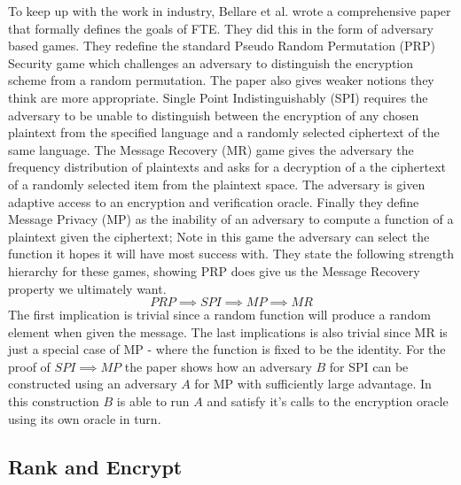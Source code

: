 \documentclass[10pt,a4paper]{article}
\begin{document}
To keep up with the work in industry, Bellare et al. wrote a comprehensive paper\cite{fpe} that formally defines the goals of FTE. They did this in the form of adversary based games. They redefine the standard Pseudo Random Permutation (PRP) Security game which challenges an adversary to distinguish the encryption scheme from a random permutation. The paper also gives weaker notions they think are more appropriate. Single Point Indistinguishably (SPI) requires the adversary to be unable to distinguish between the encryption of any chosen plaintext from the specified language and a randomly selected ciphertext of the same language. The Message Recovery (MR) game gives the adversary the frequency distribution of plaintexts and asks for a decryption of a the ciphertext of a randomly selected item from the plaintext space. The adversary is given adaptive access to an encryption and verification oracle. Finally they define Message Privacy (MP) as the inability of an adversary to compute a function of a plaintext given the ciphertext; Note in this game the adversary can select the function it hopes it will have most success with. They state the following strength hierarchy for these games, showing PRP does give us the Message Recovery property we ultimately want.
$$ PRP \implies SPI \implies MP \implies MR $$
The first implication is trivial since a random function will produce a random element when given the message. The last implications is also trivial since MR is just a special case of MP - where the function is fixed to be the identity. For the proof of $ SPI \implies MP $ the paper shows how an adversary $B$ for SPI can be constructed using an adversary $A$ for MP with sufficiently large advantage. In this construction $B$ is able to run $A$ and satisfy it's calls to the encryption oracle using its own oracle in turn.

\subsection{Rank and Encrypt}
\end{document}
